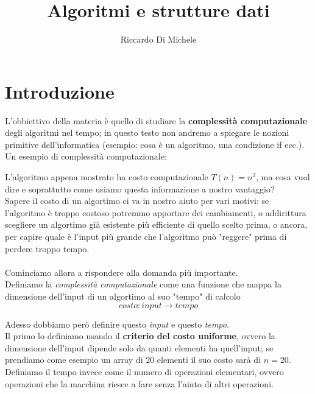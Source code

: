 \documentclass{article}
\title{Algoritmi e strutture dati}
\author{Riccardo Di Michele}
\begin{document}
\maketitle

\section*{Introduzione}
L'obbiettivo della materia è quello di studiare la 
\textbf{complessità computazionale} degli algoritmi nel tempo; in questo 
testo non andremo a spiegare le nozioni primitive dell'informatica (esempio:
cosa è un algoritmo, una condizione if ecc.).
Un esempio di complessità computazionale:

\vspace{0.3cm}

\begin{algorithm}[H]



\BlankLine
{}
\end{algorithm}

\vspace{0.3cm}
L'algoritmo appena mostrato ha costo computazionale $T(n) = n^2$, ma cosa 
vuol dire e soprattutto come usiamo
questa informazione a nostro vantaggio? \\
Sapere il costo di un algortimo ci va in nostro aiuto per vari motivi: se 
l'algoritmo è troppo costoso potremmo apportare dei cambiamenti, o addirittura
scegliere un algortimo già esistente più efficiente di quello scelto prima, o 
ancora, per capire quale è l'input più grande che l'algoritmo può "reggere" prima
di perdere troppo tempo.
\\
\\
Cominciamo allora a rispondere alla domanda più importante. \\
Definiamo la \textit{complessità computazionale} come una funzione che 
mappa la dimensione dell'input di un algortimo al suo "tempo" di calcolo
\[ costo: input \to tempo \]

Adesso dobbiamo però definire questo \textit{input} e questo \textit{tempo}. \\
Il primo lo definiamo usando il \textbf{criterio del costo uniforme}, ovvero
la dimensione dell'input dipende solo da quanti elementi ha quell'input;
se prendiamo come esempio un array di 20 elementi il suo costo sarà di 
$n = 20$. \\
Definiamo il tempo invece come il numero di operazioni elementari, ovvero 
operazioni che la macchina riesce a fare senza l'aiuto di altri operazioni.
\end{document}
